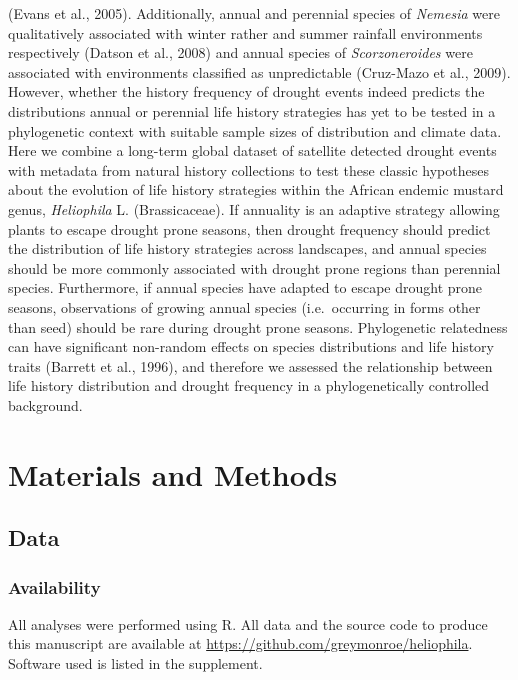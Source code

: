 \documentclass[man,floatsintext]{apa6}
\theoremstyle{definition}
\theoremstyle{definition}
\theoremstyle{definition}
\theoremstyle{remark}
\begin{document}
(Evans et al., 2005). Additionally, annual and perennial species of
\emph{Nemesia} were qualitatively associated with winter rather and
summer rainfall environments respectively (Datson et al., 2008) and
annual species of \emph{Scorzoneroides} were associated with
environments classified as unpredictable (Cruz-Mazo et al., 2009).
However, whether the history frequency of drought events indeed predicts
the distributions annual or perennial life history strategies has yet to
be tested in a phylogenetic context with suitable sample sizes of
distribution and climate data.\\
Here we combine a long-term global dataset of satellite detected drought
events with metadata from natural history collections to test these
classic hypotheses about the evolution of life history strategies within
the African endemic mustard genus, \emph{Heliophila} L. (Brassicaceae).
If annuality is an adaptive strategy allowing plants to escape drought
prone seasons, then drought frequency should predict the distribution of
life history strategies across landscapes, and annual species should be
more commonly associated with drought prone regions than perennial
species. Furthermore, if annual species have adapted to escape drought
prone seasons, observations of growing annual species (i.e.~occurring in
forms other than seed) should be rare during drought prone seasons.
Phylogenetic relatedness can have significant non-random effects on
species distributions and life history traits (Barrett et al., 1996),
and therefore we assessed the relationship between life history
distribution and drought frequency in a phylogenetically controlled
background.

\hypertarget{materials-and-methods}{%
\section{Materials and Methods}\label{materials-and-methods}}

\hypertarget{data}{%
\subsection{Data}\label{data}}

\hypertarget{availability}{%
\subsubsection{Availability}\label{availability}}

All analyses were performed using R. All data and the source code to
produce this manuscript are available at
\url{https://github.com/greymonroe/heliophila}. Software used is listed
in the supplement.
\end{document}
